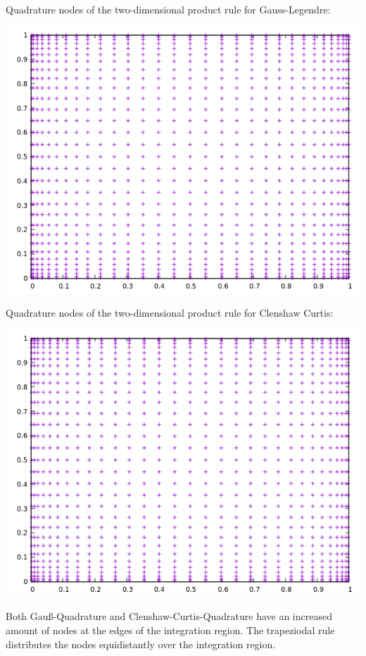 \documentclass[10pt,a4paper]{article}
\begin{document}
Quadrature nodes of the two-dimensional product rule for Gauss-Legendre:
\begin{center}
\includegraphics[scale=0.5]{quadrature_nodes_gauss_legendre.png}		
\end{center}
\newpage
Quadrature nodes of the two-dimensional product rule for Clenshaw Curtis:
\begin{center}
\includegraphics[scale=0.5]{quadrature_nodes_clenshaw_curtis.png}		
\end{center}

Both Gauß-Quadrature and Clenshaw-Curtis-Quadrature have an increased amount of nodes at the edges of the integration region. The trapeziodal rule distributes the nodes equidistantly over the integration region.
\end{document}

